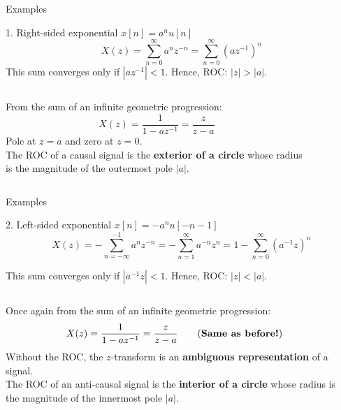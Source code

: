 \documentclass[10pt, aspectratio=169]{beamer}
\begin{document}
%
\begin{frame}{Examples}
\begin{block}{1. Right-sided exponential $x[n] = a^nu[n]$}
\begin{equation*} 
X(z) = \sum_{n=0}^\infty a^nz^{-n} = \sum_{n=0}^\infty (az^{-1})^n 
\end{equation*}
This sum converges only if $|az^{-1}| < 1$. Hence, ROC: $|z| > |a|$.
\begin{columns}
	\begin{column}{0.6\textwidth}
		From the sum of an infinite geometric progression:
		\begin{equation*} 
		X(z) = \frac{1}{1-az^{-1}} = \frac{z}{z-a}
		\end{equation*}
		Pole at $z = a$ and zero at $z = 0$.
		~\\
		The ROC of a causal signal is the \textbf{exterior of a circle} whose radius is the magnitude of the outermost pole $|a|$.
	\end{column}
	\begin{column}{0.4\textwidth}  %
		\begin{figure}
			\centering
			\resizebox{0.95\linewidth}{!}{}
			\label{fig:right_sided_exp}
		\end{figure}
	\end{column}
\end{columns}

\end{block}
\end{frame}

%
\begin{frame}{Examples}
\begin{block}{2. Left-sided exponential $x[n] = -a^nu[-n-1]$}
	\begin{equation*} 
	X(z) = -\sum_{n=-\infty}^{-1} a^nz^{-n} = -\sum_{n=1}^{\infty} a^{-n}z^{n} = 1-\sum_{n=0}^{\infty} (a^{-1}z)^{n}
	\end{equation*}
	
	This sum converges only if $|a^{-1}z| < 1$. Hence, ROC: $|z| < |a|$.
	
	\begin{columns}
		\begin{column}{0.6\textwidth}
			Once again from the sum of an infinite geometric progression:
			\begin{equation*} 
				X(z) = \frac{1}{1-az^{-1}} = \frac{z}{z-a}\tag{\textbf{Same as before!}}
			\end{equation*}
			Without the ROC, the $z$-transform is an \textbf{ambiguous representation} of a signal.
			~\\
			The ROC of an anti-causal signal is the \textbf{interior of a circle} whose radius is the magnitude of the innermost pole $|a|$.
		\end{column}
		\begin{column}{0.4\textwidth}  %
			\resizebox{0.95\linewidth}{!}{}
		\end{column}
	\end{columns}
	
\end{block}
\end{frame}
\end{document}
